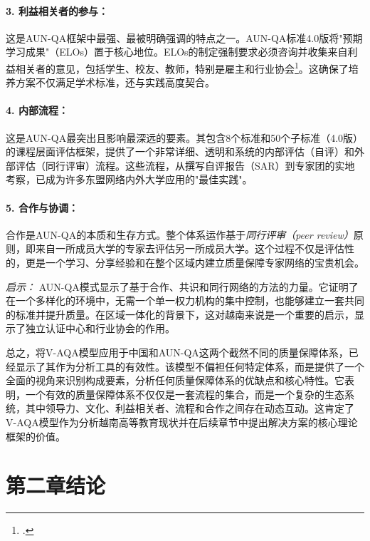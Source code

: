 \paragraph{3. 利益相关者的参与：} 这是AUN-QA框架中最强、最被明确强调的特点之一。AUN-QA标准4.0版将"预期学习成果"（ELOs）置于核心地位。ELOs的制定强制要求必须咨询并收集来自利益相关者的意见，包括学生、校友、教师，特别是雇主和行业协会\footcite{AUN-QAGuide}。这确保了培养方案不仅满足学术标准，还与实践高度契合。

\paragraph{4. 内部流程：} 这是AUN-QA最突出且影响最深远的要素。其包含8个标准和50个子标准（4.0版）的课程层面评估框架，提供了一个非常详细、透明和系统的内部评估（自评）和外部评估（同行评审）流程。这些流程，从撰写自评报告（SAR）到专家团的实地考察，已成为许多东盟网络内外大学应用的"最佳实践"。

\paragraph{5. 合作与协调：} 合作是AUN-QA的本质和生存方式。整个体系运作基于\textit{同行评审（peer review）}原则，即来自一所成员大学的专家去评估另一所成员大学。这个过程不仅是评估性的，更是一个学习、分享经验和在整个区域内建立质量保障专家网络的宝贵机会。

\textit{启示：} AUN-QA模式显示了基于合作、共识和同行网络的方法的力量。它证明了在一个多样化的环境中，无需一个单一权力机构的集中控制，也能够建立一套共同的标准并提升质量。在区域一体化的背景下，这对越南来说是一个重要的启示，显示了独立认证中心和行业协会的作用。

\bigskip %

总之，将V-AQA模型应用于中国和AUN-QA这两个截然不同的质量保障体系，已经显示了其作为分析工具的有效性。该模型不偏袒任何特定体系，而是提供了一个全面的视角来识别构成要素，分析任何质量保障体系的优缺点和核心特性。它表明，一个有效的质量保障体系不仅仅是一套流程的集合，而是一个复杂的生态系统，其中领导力、文化、利益相关者、流程和合作之间存在动态互动。这肯定了V-AQA模型作为分析越南高等教育现状并在后续章节中提出解决方案的核心理论框架的价值。






\section*{第二章结论}
\label{sec:ket_luan_chuong_2_final}

